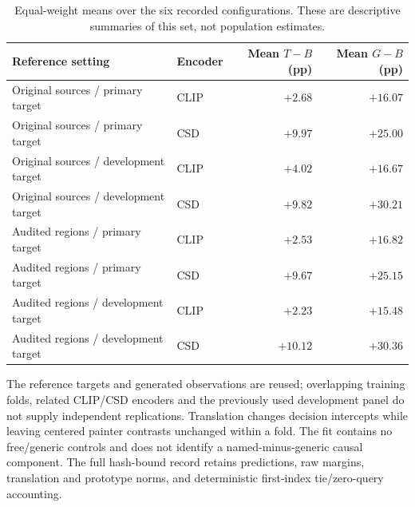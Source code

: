 \begin{table}[!htbp]
\caption{Equal-weight means over the six recorded configurations. These are descriptive summaries of this set, not population estimates.}
\label{tab:transfer-means}
\centering\small\setlength{\tabcolsep}{5pt}
\begin{tabularx}{\linewidth}{@{}Xlrr@{}}\toprule
Reference setting & Encoder & Mean $T-B$ (pp) & Mean $G-B$ (pp)\\\midrule
Original sources / primary target & CLIP & $+2.68$ & $+16.07$\\
Original sources / primary target & CSD & $+9.97$ & $+25.00$\\
Original sources / development target & CLIP & $+4.02$ & $+16.67$\\
Original sources / development target & CSD & $+9.82$ & $+30.21$\\
Audited regions / primary target & CLIP & $+2.53$ & $+16.82$\\
Audited regions / primary target & CSD & $+9.67$ & $+25.15$\\
Audited regions / development target & CLIP & $+2.23$ & $+15.48$\\
Audited regions / development target & CSD & $+10.12$ & $+30.36$\\
\bottomrule\end{tabularx}

\end{table}

The reference targets and generated observations are reused; overlapping training folds, related CLIP/CSD encoders and the previously used development panel do not supply independent replications. Translation changes decision intercepts while leaving centered painter contrasts unchanged within a fold. The fit contains no free/generic controls and does not identify a named-minus-generic causal component. The full hash-bound record retains predictions, raw margins, translation and prototype norms, and deterministic first-index tie/zero-query accounting.
\clearpage
